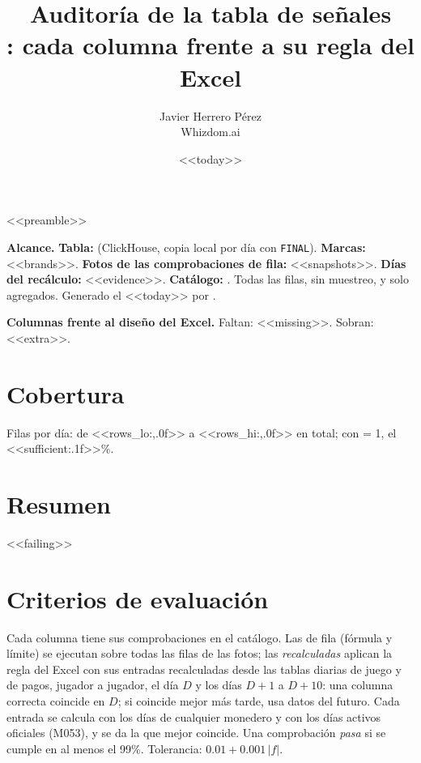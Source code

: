 <<preamble>>
\newcommand{\prioE}{\badge{BrickRed}{ERROR}}
\newcommand{\prioC}{\badge{BurntOrange}{A CONFIRMAR}}
\title{\textbf{Auditoría de la tabla de señales}\\[2pt]\large{}: cada columna frente a su regla del Excel}
\date{<<today>>}
\author{Javier Herrero Pérez \\ Whizdom.ai}


\maketitle
\vspace{-1.2cm}

\textbf{Alcance.} \textbf{Tabla:}  (ClickHouse, copia local por día con \texttt{FINAL}). \textbf{Marcas:} <<brands>>. \textbf{Fotos de las comprobaciones de fila:} <<snapshots>>. \textbf{Días del recálculo:} <<evidence>>. \textbf{Catálogo:} . Todas las filas, sin muestreo, y solo agregados. Generado el <<today>> por .

\textbf{Columnas frente al diseño del Excel.} Faltan: <<missing>>. Sobran: <<extra>>.

\section{Cobertura}
Filas por día: de <<rows_lo:,.0f>> a <<rows_hi:,.0f>> en total; con  = 1, el <<sufficient:.1f>>\%.

\section{Resumen}
\begin{center}

\end{center}

<<failing>>

\section{Criterios de evaluación}
Cada columna tiene sus comprobaciones en el catálogo. Las de fila (fórmula y límite) se ejecutan sobre todas las filas de las fotos; las \emph{recalculadas} aplican la regla del Excel con sus entradas recalculadas desde las tablas diarias de juego y de pagos, jugador a jugador, el día $D$ y los días $D+1$ a $D+10$: una columna correcta coincide en $D$; si coincide mejor más tarde, usa datos del futuro. Cada entrada se calcula con los días de cualquier monedero y con los días activos oficiales (M053), y se da la que mejor coincide. Una comprobación \emph{pasa} si se cumple en al menos el 99\%. Tolerancia: $0.01 + 0.001\,|f|$.

